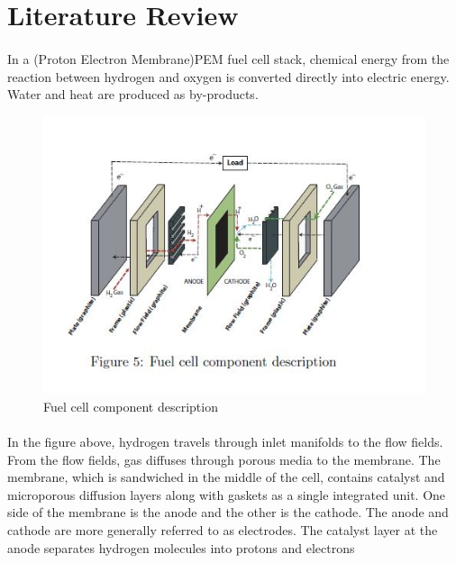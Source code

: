 \section{Literature Review}
\paragraph{}In a (Proton Electron Membrane)PEM fuel cell stack, chemical energy from the reaction between hydrogen and oxygen is converted directly into electric energy. Water and heat are produced as by-products.
\begin{figure}[!h]
\includegraphics{Figures/Figure4}
\caption{Fuel cell component description
\cite{stefanopoulou_mechatronics_nodate}}
\end{figure} 
\paragraph{}In the figure above, hydrogen travels through inlet manifolds to the flow fields. From the flow fields, gas diffuses through porous media to the membrane. The membrane, which is sandwiched in the middle of the cell, contains catalyst and microporous diffusion layers along with gaskets as a single integrated unit. One side of the membrane is  the anode and the other is the cathode. The anode and cathode are more generally referred to as electrodes. The catalyst layer at the anode separates hydrogen molecules into protons and electrons
